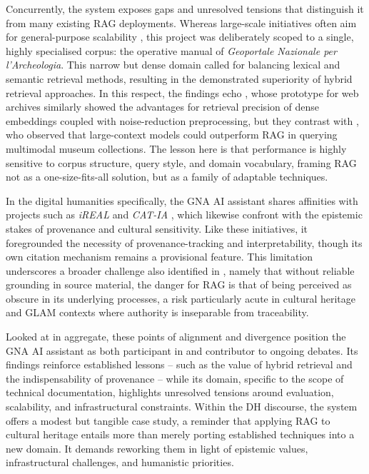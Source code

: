 \begin{spacing}{1.5}
Concurrently, the system exposes gaps and unresolved tensions that distinguish it from many existing RAG deployments. Whereas large-scale initiatives often aim for general-purpose scalability \citep{ramos-varela_context_2025,lala_paperqa_2023}, this project was deliberately scoped to a single, highly specialised corpus: the operative manual of \textit{Geoportale Nazionale per l’Archeologia}. This narrow but dense domain called for balancing lexical and semantic retrieval methods, resulting in the demonstrated superiority of hybrid retrieval approaches. In this respect, the findings echo \citet{davis_unlocking_2025}, whose prototype for web archives similarly showed the advantages for retrieval precision of dense embeddings coupled with noise-reduction preprocessing, but they contrast with \citet{ramos-varela_context_2025}, who observed that large-context models could outperform RAG in querying multimodal museum collections. The lesson here is that performance is highly sensitive to corpus structure, query style, and domain vocabulary, framing RAG not as a one-size-fits-all solution, but as a family of adaptable techniques.

In the digital humanities specifically, the GNA AI assistant shares affinities with projects such as \textit{iREAL} \citep{callaghan_prototyping_2025} and \textit{CAT-IA} \citep{barbato_nasce_2025}, which likewise confront with the epistemic stakes of provenance and cultural sensitivity. Like these initiatives, it foregrounded the necessity of provenance-tracking and interpretability, though its own citation mechanism remains a provisional feature. This limitation underscores a broader challenge also identified in \citet{pollin_workshop_2024}, namely that without reliable grounding in source material, the danger for RAG is that of being perceived as obscure in its underlying processes, a risk particularly acute in cultural heritage and GLAM contexts where authority is inseparable from traceability.

Looked at in aggregate, these points of alignment and divergence position the GNA AI assistant as both participant in and contributor to ongoing debates. Its findings reinforce established lessons -- such as the value of hybrid retrieval and the indispensability of provenance -- while its domain, specific to the scope of technical documentation, highlights unresolved tensions around evaluation, scalability, and infrastructural constraints. Within the DH discourse, the system offers a modest but tangible case study, a reminder that applying RAG to cultural heritage entails more than merely porting established techniques into a new domain. It demands reworking them in light of epistemic values, infrastructural challenges, and humanistic priorities.


\end{spacing}
